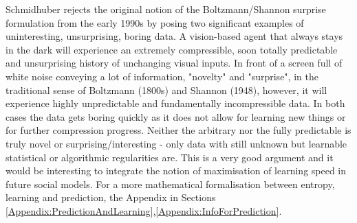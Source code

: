 Schmidhuber rejects the original notion of the Boltzmann/Shannon surprise formulation from the 
early 1990s by posing two significant examples of uninteresting, unsurprising, boring data.
A vision-based agent that always stays in the dark will experience an extremely
 compressible, soon totally predictable and unsurprising history of unchanging
 visual inputs. In front of a screen full of white noise conveying a lot of
 information, "novelty" and "surprise", in the traditional sense of Boltzmann
 (1800s) and Shannon (1948), however, it will experience highly unpredictable
 and fundamentally incompressible data.
In both cases the data gets boring quickly as it does not allow for learning
 new things or for further compression progress.
Neither the arbitrary nor the fully predictable is truly novel or surprising/interesting - 
only data with still unknown but learnable statistical or
algorithmic regularities are. This is a very good argument and it would be
interesting to integrate the notion of maximisation of learning speed in
future social models.
For a more mathematical formalisation between entropy, learning and prediction, the Appendix
in Sections \ref{Appendix:PredictionAndLearning},\ref{Appendix:InfoForPrediction}.

